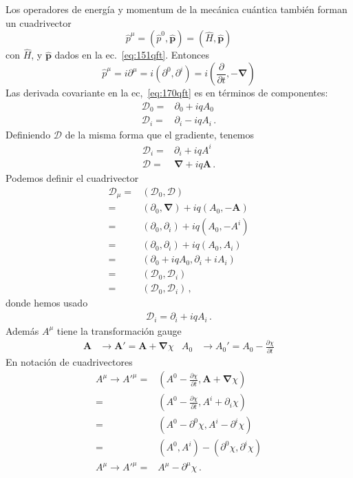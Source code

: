 Los operadores de energía y momentum de la mecánica cuántica también forman un cuadrivector
\begin{equation}
  \hat p^\mu=({\hat p}^0,\hat{\mathbf{p}})=(\widehat H,\hat{\mathbf{p}})
\end{equation}
con $\widehat H$, y $\hat{\mathbf{p}}$ dados en la ec.~\eqref{eq:151qft}. Entonces
\begin{equation}
  \label{eq:cv_hatpmu}
  \hat{p}^\mu=i\partial^\mu=i(\partial^0,\partial^i)=i(\frac{\partial}{\partial t},-\boldsymbol{\nabla})
\end{equation}
Las derivada covariante en la ec,~\eqref{eq:170qft} es en términos de componentes:
\begin{align}
   \mathcal{D}_0=&\partial_0+i q A_0\nonumber\\
  \mathcal{D}_i=&\partial_i-i q A_i\,.
\end{align}
Definiendo $\boldsymbol{\mathcal{D}}$ de la misma forma que el gradiente, tenemos
\begin{align}
  \mathcal{D}_i=&\partial_i+i q A^i\nonumber\\
  \boldsymbol{\mathcal{D}}=&\boldsymbol{\nabla}+i q \mathbf{A}\,.
\end{align}
Podemos definir el cuadrivector
\begin{align}
  \mathcal{D}_\mu=&(\mathcal{D}_0,\boldsymbol{\mathcal{D}})\nonumber\\
=&(\partial_0,\boldsymbol{\nabla})+i q(A_0,-\mathbf{A})\nonumber\\
=&(\partial_0,\partial_i)+i q(A_0,-A^i)\nonumber\\
=&(\partial_0,\partial_i)+i q(A_0,A_i)\nonumber\\
=&(\partial_0+i q A_0,\partial_i+i A_i)\nonumber\\
=&(\mathcal{D}_0,\mathcal{D}_i)\nonumber\\
=&(\mathcal{D}_0,\mathcal{D}_i)\,,
\end{align}
donde hemos usado
\begin{align}
  \mathcal{D}_i=\partial_i+i q A_i\,.
\end{align}
Además $A^\mu$ tiene la transformación gauge
\begin{align}
  \mathbf{A}&\to\mathbf{A}'=\mathbf{A}+\boldsymbol{\nabla}\chi&
  A_0&\to A_0'=A_0-\frac{\partial\chi}{\partial t} 
\end{align}
En notación de cuadrivectores
\begin{align}
  \label{eq:166qft}
  A^\mu\to {A'}^\mu=&\left(A^0-\frac{\partial\chi}{\partial t},\mathbf{A}+\boldsymbol{\nabla}\chi
  \right)\nonumber\\
  =&\left(A^0-\frac{\partial\chi}{\partial t},A^{i}+\partial_i\chi
  \right)\nonumber\\
  =&\left(A^0-\partial^0\chi,A^{i}-\partial^{i}\chi
  \right)\nonumber\\
  =&\left(A^0,A^{i}
  \right)-
  \left(
    \partial^0\chi,\partial^{i}\chi
  \right)\nonumber\\
  A^\mu\to {A'}^\mu=&A^\mu-\partial^\mu\chi\,.
\end{align}
